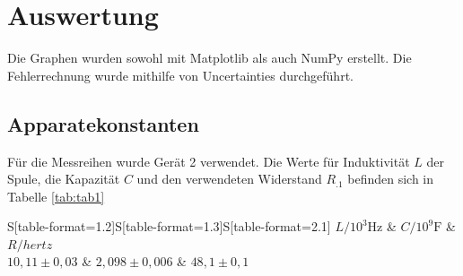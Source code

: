\section{Auswertung}
\label{sec:Auswertung}


Die Graphen wurden sowohl mit Matplotlib \cite{matplotlib} als auch NumPy \cite{numpy} erstellt. Die
Fehlerrechnung wurde mithilfe von Uncertainties \cite{uncertainties} durchgeführt.

\subsection{Apparatekonstanten}
Für die Messreihen wurde Gerät 2 verwendet.
Die Werte für Induktivität $L$ der Spule, die Kapazität $C$ und den verwendeten Widerstand $R_.1$ befinden sich in Tabelle \ref{tab:tab1}

\begin{table}
	\centering
	\caption{Apparatekonstanten}
\label{tab:tab1}
	\begin{tabular}{S[table-format=1.2]S[table-format=1.3]S[table-format=2.1]}
		\toprule
		{$L/ 10^3 \si{\hertz}$} & {$C/10^9\si{\farad}$} & {$R/\si{hertz}$} \\
		\midrule
		${10,11\pm 0,03}$ & ${2,098\pm 0,006}$ & ${48,1\pm 0,1}$ \\
		\bottomrule
	\end{tabular}
\end{table}
